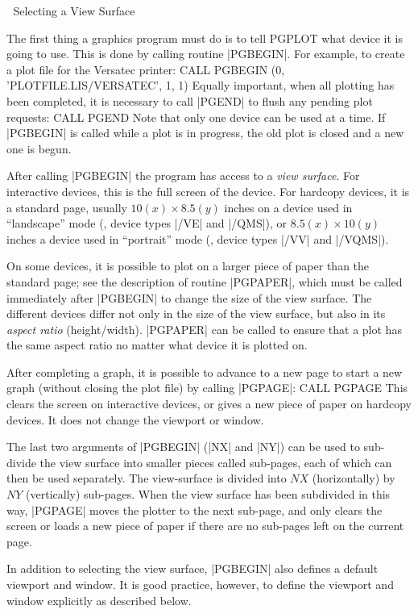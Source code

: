 
\beginsection Selecting a View Surface

The first thing a graphics program must do is to tell PGPLOT what
device it is going to use. This is done by calling routine |PGBEGIN|.
For example, to create a plot file for the Versatec printer: 
\begintt
CALL PGBEGIN (0, 'PLOTFILE.LIS/VERSATEC', 1, 1)
\endtt
Equally important, when all plotting has been completed, it is necessary 
to call |PGEND| to flush any pending plot requests: 
\begintt
CALL PGEND
\endtt
Note that only one device can be used at a time.  If |PGBEGIN| is called 
while a plot is in progress, the old plot is closed and a new one is 
begun.

After calling |PGBEGIN| the program has access to a {\it view surface}.  For
interactive devices, this is the full screen of the device. For hardcopy
devices, it is a standard page, usually $10 (x) \times 8.5 (y)$ inches on
a device used in ``landscape'' mode (\eg, device types |/VE| and |/QMS|),
or $8.5 (x) \times 10 (y)$ inches a device used in ``portrait'' mode 
(\eg, device types |/VV| and |/VQMS|).

On some devices, it is possible to plot on a larger piece of paper than 
the standard page; see the description of routine |PGPAPER|, which must 
be called immediately after |PGBEGIN| to change the size of the view 
surface. The different devices differ not only in the size of the
view surface, but also in its {\it aspect ratio\/} (height/width).
|PGPAPER| can be called to ensure that a plot has the same aspect ratio
no matter what device it is plotted on. 

After completing a graph, it is possible to advance to a new page to start a
new graph (without closing the plot file) by calling |PGPAGE|:
\begintt
CALL PGPAGE
\endtt
This clears the screen on interactive devices, or gives a new piece of
paper on hardcopy devices. It does not change the viewport or window.

The last two arguments of |PGBEGIN| (|NX| and |NY|) can be used to
sub-divide the view surface into smaller pieces called sub-pages, each
of which can then be used separately. The view-surface is divided into
$NX$ (horizontally) by $NY$ (vertically) sub-pages. When the view
surface has been subdivided in this way, |PGPAGE| moves the plotter
to the next sub-page, and only clears the screen or loads a new piece of
paper if there are no sub-pages left on the current page.

In addition to selecting the view surface, |PGBEGIN| also defines a 
default viewport and window.  It is good practice, however, to define 
the viewport and window explicitly as described below.

